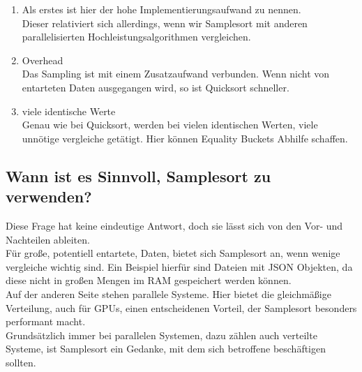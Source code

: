 		\begin{enumerate}
			\item Als erstes ist hier der hohe Implementierungsaufwand zu nennen.\\
				Dieser relativiert sich allerdings, wenn wir Samplesort mit anderen parallelisierten Hochleistungsalgorithmen vergleichen.
			\item Overhead\\
				Das Sampling ist mit einem Zusatzaufwand verbunden.
				Wenn nicht von entarteten Daten ausgegangen wird, so ist Quicksort schneller.
			\item viele identische Werte\\
				Genau wie bei Quicksort, werden bei vielen identischen Werten, viele unnötige vergleiche getätigt.
				Hier können Equality Buckets Abhilfe schaffen.
		\end{enumerate}
		
	\subsection{Wann ist es Sinnvoll, Samplesort zu verwenden?}
		Diese Frage hat keine eindeutige Antwort, doch sie lässt sich von den Vor- und Nachteilen ableiten.\\
		Für große, potentiell entartete, Daten, bietet sich Samplesort an, wenn wenige vergleiche wichtig sind.
		Ein Beispiel hierfür sind Dateien mit JSON Objekten, da diese nicht in großen Mengen im RAM gespeichert werden können.\\
		Auf der anderen Seite stehen parallele Systeme. Hier bietet die gleichmäßige Verteilung, auch für GPUs, einen entscheidenen Vorteil, der Samplesort besonders performant macht.\\
		Grundsätzlich immer bei parallelen Systemen, dazu zählen auch verteilte Systeme, ist Samplesort ein Gedanke, mit dem sich betroffene beschäftigen sollten.
